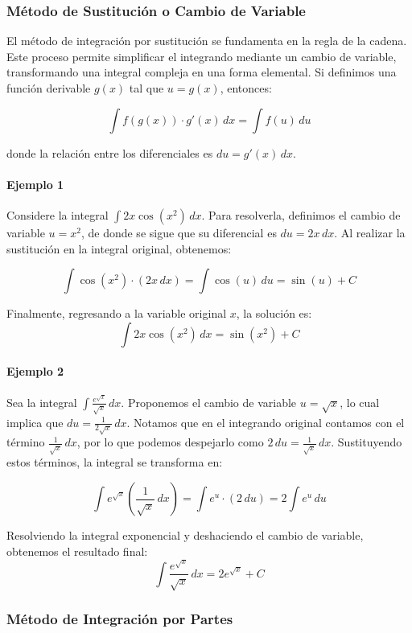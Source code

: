 \documentclass[12pt]{article}
\begin{document}
\subsubsection{Método de Sustitución o Cambio de Variable}

El método de integración por sustitución se fundamenta en la regla de la cadena. Este proceso permite simplificar el integrando mediante un cambio de variable, transformando una integral compleja en una forma elemental. Si definimos una función derivable \( g(x) \) tal que \( u = g(x) \), entonces:

\[
\int f(g(x)) \cdot g'(x) \, dx = \int f(u) \, du
\]

donde la relación entre los diferenciales es \( du = g'(x) \, dx \).

\paragraph{Ejemplo 1}
Considere la integral \( \int 2x \cos(x^2) \, dx \). Para resolverla, definimos el cambio de variable \( u = x^2 \), de donde se sigue que su diferencial es \( du = 2x \, dx \). Al realizar la sustitución en la integral original, obtenemos:

\[
\int \cos(x^2) \cdot (2x \, dx) = \int \cos(u) \, du = \sin(u) + C
\]

Finalmente, regresando a la variable original \( x \), la solución es:
\[
\int 2x \cos(x^2) \, dx = \sin(x^2) + C
\]

\paragraph{Ejemplo 2}
Sea la integral \( \int \frac{e^{\sqrt{x}}}{\sqrt{x}} \, dx \). Proponemos el cambio de variable \( u = \sqrt{x} \), lo cual implica que \( du = \frac{1}{2\sqrt{x}} \, dx \). Notamos que en el integrando original contamos con el término \( \frac{1}{\sqrt{x}} \, dx \), por lo que podemos despejarlo como \( 2 \, du = \frac{1}{\sqrt{x}} \, dx \). Sustituyendo estos términos, la integral se transforma en:

\[
\int e^{\sqrt{x}} \left( \frac{1}{\sqrt{x}} \, dx \right) = \int e^u \cdot (2 \, du) = 2\int e^u \, du
\]

Resolviendo la integral exponencial y deshaciendo el cambio de variable, obtenemos el resultado final:
\[
\int \frac{e^{\sqrt{x}}}{\sqrt{x}} \, dx = 2e^{\sqrt{x}} + C
\]
\subsubsection{Método de Integración por Partes}
\end{document}
